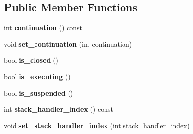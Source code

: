 \subsection*{Public Member Functions}
\begin{DoxyCompactItemize}
\item 
\hypertarget{classv8_1_1internal_1_1_j_s_generator_object_ada220111a8ff4ecf1edb0ae2bc50f042}{}int {\bfseries continuation} () const \label{classv8_1_1internal_1_1_j_s_generator_object_ada220111a8ff4ecf1edb0ae2bc50f042}

\item 
\hypertarget{classv8_1_1internal_1_1_j_s_generator_object_a5bb469af27f4edd8cfce380ac9fc8546}{}void {\bfseries set\+\_\+continuation} (int continuation)\label{classv8_1_1internal_1_1_j_s_generator_object_a5bb469af27f4edd8cfce380ac9fc8546}

\item 
\hypertarget{classv8_1_1internal_1_1_j_s_generator_object_adad3cdf7dfb6cd10a851c7bf7c30bbf4}{}bool {\bfseries is\+\_\+closed} ()\label{classv8_1_1internal_1_1_j_s_generator_object_adad3cdf7dfb6cd10a851c7bf7c30bbf4}

\item 
\hypertarget{classv8_1_1internal_1_1_j_s_generator_object_a4b0519701a6f0e9d6b7b1eaf91e1e95f}{}bool {\bfseries is\+\_\+executing} ()\label{classv8_1_1internal_1_1_j_s_generator_object_a4b0519701a6f0e9d6b7b1eaf91e1e95f}

\item 
\hypertarget{classv8_1_1internal_1_1_j_s_generator_object_a2f4a7d1d80a77d2ab2f0f6b0203fdadc}{}bool {\bfseries is\+\_\+suspended} ()\label{classv8_1_1internal_1_1_j_s_generator_object_a2f4a7d1d80a77d2ab2f0f6b0203fdadc}

\item 
\hypertarget{classv8_1_1internal_1_1_j_s_generator_object_a80b0ea1e26e3e2ad32bc84067515ec33}{}int {\bfseries stack\+\_\+handler\+\_\+index} () const \label{classv8_1_1internal_1_1_j_s_generator_object_a80b0ea1e26e3e2ad32bc84067515ec33}

\item 
\hypertarget{classv8_1_1internal_1_1_j_s_generator_object_aa5e972cb91023a98556b4e2d81bcc51f}{}void {\bfseries set\+\_\+stack\+\_\+handler\+\_\+index} (int stack\+\_\+handler\+\_\+index)\label{classv8_1_1internal_1_1_j_s_generator_object_aa5e972cb91023a98556b4e2d81bcc51f}

\end{DoxyCompactItemize}
